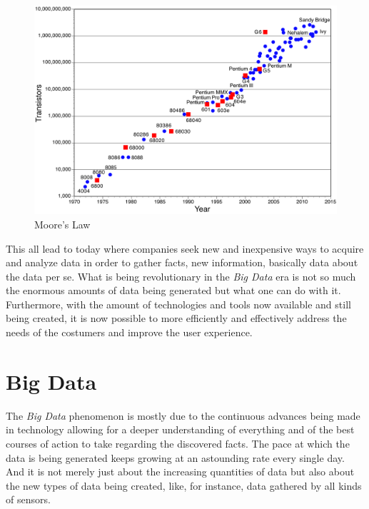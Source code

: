 \documentclass{llncs}
\begin{document}
\FloatBarrier
\begin{figure}[ht!]
\centering
\includegraphics[scale=0.31]{Moores_Law.png}
\caption{Moore's Law~\cite{mooreslawgraph}}
\label{fig:minipage1}
\end{figure}
\FloatBarrier


This all lead to today where companies seek new and inexpensive ways to acquire and analyze data in order to gather facts, new information, basically data about the data per se. What is being revolutionary in the \textit{Big Data} era is not so much the enormous amounts of data being generated but what one can do with it. Furthermore, with the amount of technologies and tools now available and still being created, it is now possible to more efficiently and effectively address the needs of the costumers and improve the user experience.~\cite{Shaw2014}

\section{Big Data}

The \textit{Big Data} phenomenon is mostly due to the continuous advances being made in technology allowing for a deeper understanding of everything and of the best courses of action to take regarding the discovered facts. The pace at which the data is being generated keeps growing at an astounding rate every single day. And it is not merely just about the increasing quantities of data but also about the new types of data being created, like, for instance, data gathered by all kinds of sensors. ~\cite{Kelly2013}~\cite{Russom2011}
\end{document}

